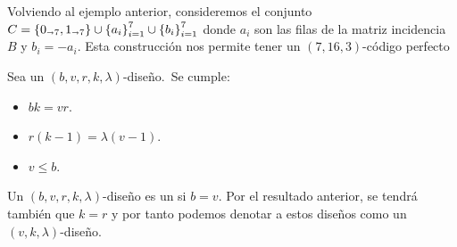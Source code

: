 \begin{example}
	Volviendo al ejemplo anterior, consideremos el conjunto $C=\left\{0_{\shortrightarrow 7}, 1_{\shortrightarrow 7}\right\}\cup \left\{a_i\right\}_{i=1}^7\cup \left\{b_i\right\}_{i=1}^7$ donde $a_i$ son las filas de la matriz incidencia $B$ y $b_i = -a_i$.
	Esta construcción nos permite tener un $(7, 16 ,3)$-código perfecto
\end{example}

\begin{lemma}
	Sea un $(b, v, r, k, \lambda)$-diseño.\ Se cumple:
	\begin{itemize}
		\item $bk=vr$.
		\item $r(k-1)=\lambda(v-1)$.
		\item $v\leq b$.
	\end{itemize}
\end{lemma}

\begin{definition}
	Un $(b, v, r, k, \lambda)$-diseño es un  si $b=v$.
	Por el resultado anterior, se tendrá también que $k=r$ y por tanto podemos denotar a estos diseños como un $(v, k, \lambda)$-diseño.
\end{definition}